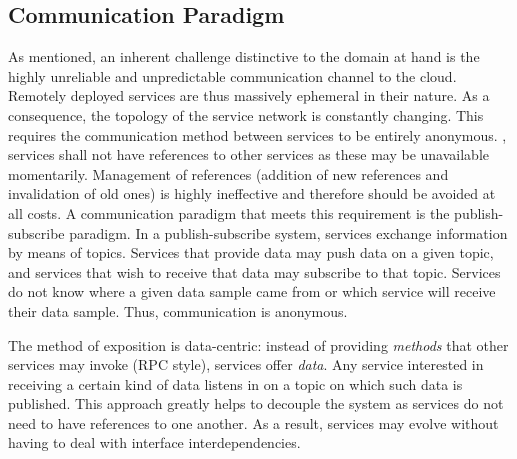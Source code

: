 \subsection{Communication Paradigm}
As mentioned, an inherent challenge distinctive to the domain at hand is the highly unreliable and unpredictable communication channel to the cloud. Remotely deployed services are thus massively ephemeral in their nature. As a consequence, the topology of the service network is constantly changing. This requires the communication method between services to be entirely anonymous. \Ie , services shall not have references to other services as these may be unavailable momentarily. Management of references (addition of new references and invalidation of old ones) is highly ineffective and therefore should be avoided at all costs. A communication paradigm that meets this requirement is the publish-subscribe paradigm. In a publish-subscribe system, services exchange information by means of topics. Services that provide data may push data on a given topic, and services that wish to receive that data may subscribe to that topic. Services do not know where a given data sample came from or which service will receive their data sample. Thus, communication is anonymous.


The method of exposition is data-centric: instead of providing \emph{methods} that other services may invoke (RPC style), services offer \emph{data}. Any service interested in receiving a certain kind of data listens in on a topic on which such data is published. This approach greatly helps to decouple the system as services do not need to have references to one another. As a result, services may evolve without having to deal with interface interdependencies.


